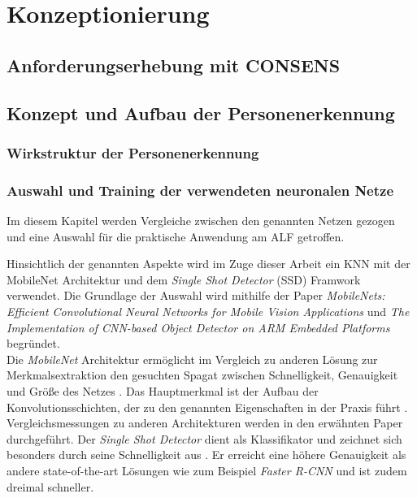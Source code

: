 \chapter{Konzeptionierung}
\label{ch: Konzeptionierung}

	
	
	\section{Anforderungserhebung mit CONSENS}
	\label{sec: Anforderungserhebung}
			
	
	\section{Konzept und Aufbau der Personenerkennung}
	
		\subsection{Wirkstruktur der Personenerkennung}
		
		\subsection{Auswahl und Training der verwendeten neuronalen Netze}
		
		Im diesem Kapitel werden Vergleiche zwischen den genannten Netzen gezogen und eine Auswahl für die praktische Anwendung am ALF getroffen.
		
			
		
		Hinsichtlich der genannten Aspekte wird im Zuge dieser Arbeit ein KNN mit der MobileNet Architektur und dem \textit{Single Shot Detector} (SSD) Framwork verwendet. Die Grundlage der Auswahl wird mithilfe der Paper \textit{MobileNets: Efficient Convolutional Neural Networks for  Mobile Vision Applications} \cite{mobilenets} und \textit{The Implementation of CNN-based Object Detector on ARM Embedded Platforms} \cite{embedded} begründet.\\
		
		Die \textit{MobileNet} Architektur ermöglicht im Vergleich zu anderen Lösung zur Merkmalsextraktion den gesuchten Spagat zwischen Schnelligkeit, Genauigkeit und Größe des Netzes \cite{mobilenets}. Das Hauptmerkmal ist der Aufbau der Konvolutionsschichten, der zu den genannten Eigenschaften in der Praxis führt \cite{mobilenets} \cite{embedded}. Vergleichsmessungen zu anderen Architekturen werden in den erwähnten Paper durchgeführt. Der \textit{Single Shot Detector} dient als Klassifikator und zeichnet sich besonders durch seine Schnelligkeit aus \cite{ssd}. Er erreicht eine höhere Genauigkeit als andere state-of-the-art Lösungen wie zum Beispiel \textit{Faster R-CNN} \cite{fasterrcnn} und ist zudem dreimal schneller\cite{ssd}.
		
